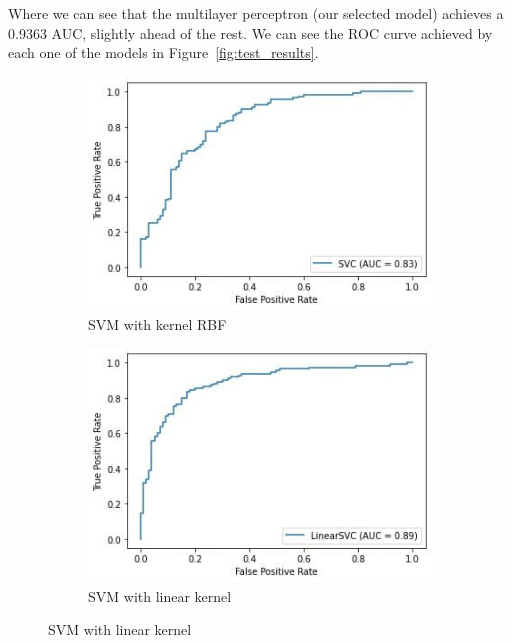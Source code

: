 \documentclass[11pt]{article}
\begin{document}
Where we can see that the multilayer perceptron (our selected model) achieves a 0.9363 AUC, slightly ahead of the rest. We can see the ROC curve achieved by each one of the models in Figure~\ref{fig:test_results}.


    \begin{figure}
        \centering
        \begin{subfigure}[b]{0.475\textwidth}
            \centering
            \includegraphics[width=\textwidth]{imgs/auc_svm.jpg}
            \caption[]{{\small SVM with kernel RBF}}    
        \end{subfigure}
        \hfill
        \begin{subfigure}[b]{0.475\textwidth}  
            \centering 
            \includegraphics[width=\textwidth]{imgs/auc_linearsvm.jpg}
            \caption[]{{\small SVM with linear kernel}}    
        \end{subfigure}

\end{figure}
\end{document}
